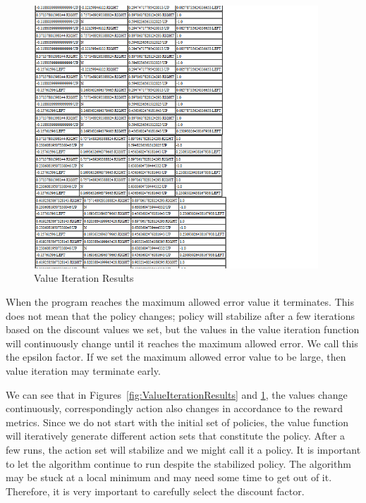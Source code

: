 \begin{figure}[h!]
    \begin{center}
        \includegraphics[width=0.95\textwidth]{Figures/Planning_Figure_3.png}
        \caption{Value Iteration Results}
        \label{fig:ValueIterationResults2}
    \end{center}
\end{figure}
\FloatBarrier
When the program reaches the maximum allowed error value it terminates. This
does not mean that the policy changes; policy will stabilize after a few
iterations based on the discount values we set, but the values in the value
iteration function will continuously change until it reaches the maximum allowed
error. We call this the epsilon factor. If we set the maximum allowed error
value to be large, then value iteration may terminate early.

We can see that in Figures~\ref{fig:ValueIterationResults} and
\ref{fig:ValueIterationResults2}, the values change continuously,
correspondingly action also
changes in accordance to the reward metrics. Since we do not start with the
initial set of policies, the value function will iteratively generate different
action sets that constitute the policy. After a few runs, the action set will
stabilize and we might call it a policy. It is important to let the
algorithm continue to run despite the stabilized policy. The algorithm may 
be stuck at a local minimum and may need some time
to get out of it.  Therefore, it is very important to carefully select the
discount factor.

